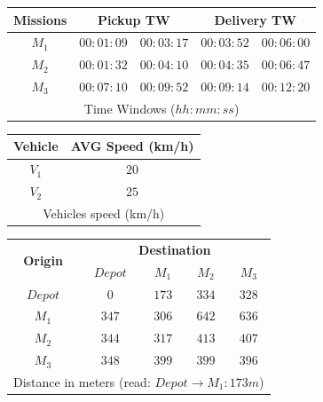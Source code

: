 \documentclass[a4paper,10pt]{article}
\begin{document}
\begin{figure}[h]
\label{example}
 \tiny
 \begin{center}
    \begin{tabular}{|c|c|c|c|c|} 
    \hline
    {\bf Missions} & \multicolumn{2}{|c|}{\bf Pickup TW} & \multicolumn{2}{|c|}{\bf Delivery TW} \\ \hline
    $M_1$	 & $00:01:09$ & $00:03:17$	& $00:03:52$ & $00:06:00$\\
    $M_2$	 & $00:01:32$ & $00:04:10$	& $00:04:35$ & $00:06:47$\\
    $M_3$	 & $00:07:10$ & $00:09:52$	& $00:09:14$ & $00:12:20$\\
    \hline
    \multicolumn{5}{c}{Time Windows ($hh:mm:ss$)}
    \end{tabular}
\end{center}
\begin{center}
    \begin{tabular}{|c|c|} 
    \hline
    {\bf Vehicle} & {\bf AVG Speed (km/h)} \\ \hline
    $V_1$	 & $20$\\
    $V_2$	 & $25$\\
    \hline
    \multicolumn{2}{c}{Vehicles speed (km/h)}
    \end{tabular}
  \end{center}
  
  \begin{center}
    \begin{tabular}{|c|c|c|c|c|} 
    \hline
    
    \multirow{2}{*}{\bf{Origin}} & \multicolumn{4}{c|}{\bf{Destination}}\\ \cline{2-5}
    	 	& {\bf $Depot$}	& {\bf $M_1$}	& $M_2$		& $M_3$\\ \hline
    {\bf $Depot$}	& $0$		& $173$		& $334$		& $328$\\
    {\bf $M_1$}		& $347$		& $306$		& $642$		& $636$\\
    {\bf $M_2$}		& $344$		& $317$		& $413$		& $407$\\
    {\bf $M_3$}		& $348$		& $399$		& $399$		& $396$\\
    \hline
    \multicolumn{5}{c}{Distance in meters (read: $Depot\rightarrow M_1 : 173 m$)}
    \end{tabular}

  \end{center}


\end{figure}
\end{document}
